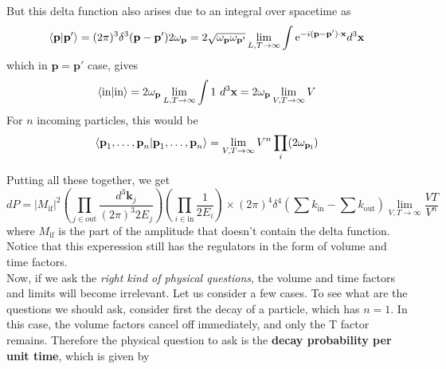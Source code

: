 \documentclass[11pt, notitlepage]{report}
\newcommand{\e}{\mathrm{e}}
\newcommand{\w}{\omega}
\numberwithin{equation}{section}
\begin{document}
    But this delta function also arises due to an integral over spacetime as 
    \begin{equation*}
        \braket{\textbf{p}|\textbf{p}'} = (2\pi)^3 \delta^3(\textbf{p} - \textbf{p}')2\w_\textbf{p} = 2\sqrt{\w_\textbf{p}\w_\textbf{p'}}\lim_{L,T\to\infty} \int \e^{-i(\textbf{p}-\textbf{p}')\cdot \textbf{x}} d^3\textbf{x}
    \end{equation*}
    which in \(\textbf{p}=\textbf{p}'\) case, gives 
    \begin{equation*}
        \braket{\text{in}|\text{in}} = 2\w_\textbf{p}\lim_{L,T\to\infty} \int 1~d^3\textbf{x} = 2\w_\textbf{p}\lim_{V,T\to\infty} V
    \end{equation*}
    For \(n\) incoming particles, this would be 
    \begin{equation*}
        \braket{\textbf{p}_1,\ldots,\textbf{p}_n|\textbf{p}_1,\ldots,\textbf{p}_n} = \lim_{V,T\to\infty} V^n \prod_{i} (2\w_\mathbf{p_i})
    \end{equation*}

    Putting all these together, we get 
    \begin{equation*}
        dP = |M_{\text{if}}|^2 \left(\prod_{j\in\text{out}}\frac{d^3\textbf{k}_j}{(2\pi)^3 2E_j}\right) \left(\prod_{i\in \text{in}} \frac{1}{2E_i}   \right)\times (2\pi)^4\delta^4\left(\sum k_{\text{in}} - \sum k_{\text{out}} \right)\lim_{V,T\to \infty}\frac{VT}{V^n}
    \end{equation*}
    where \(M_{\text{if}}\) is the part of the amplitude that doesn't contain the delta function. Notice that this experession still has the regulators in the form of volume and time factors.\\

    Now, if we ask the \textit{right kind of physical questions}, the volume and time factors and limits will become irrelevant. Let us consider a few cases. To see what are the questions we should ask, consider first the decay of a particle, which has \(n=1\). In this case, the volume factors cancel off immediately, and only the T factor remains. Therefore the physical question to ask is the \textbf{decay probability per unit time}, which is given by 
\end{document}
